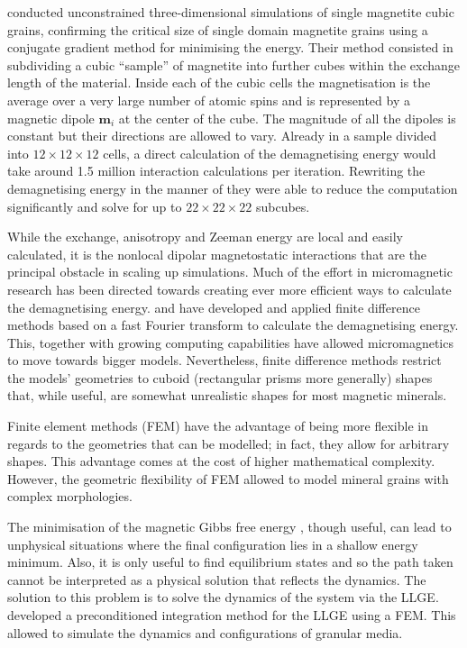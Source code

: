 \citet{Wyn2} conducted unconstrained three-dimensional simulations of single magnetite cubic grains, confirming the critical size of single domain magnetite grains using a conjugate gradient method for minimising the energy. Their method consisted in subdividing a cubic ``sample'' of magnetite into further cubes within the exchange length of the material. Inside each of the cubic cells the magnetisation is the average over a very large number of atomic spins and is represented by a magnetic dipole $\mathbf{m}_i$ at the center of the cube. The magnitude of all the dipoles is constant but their directions are allowed to vary. Already in a sample divided into $12\times 12\times 12$ cells, a direct calculation of the demagnetising energy would take around 1.5 million interaction calculations per iteration. Rewriting the demagnetising energy in the manner of \citet{Rhodes} they were able to reduce the computation significantly and solve for up to $22\times 22\times 22$ subcubes.\par

While the exchange, anisotropy and Zeeman energy are local and easily calculated, it is the nonlocal dipolar magnetostatic interactions that are the principal obstacle in scaling up simulations. Much of the effort in micromagnetic research has been directed towards creating ever more efficient ways to calculate the demagnetising energy. \citet{Fabian} and \citet{Wright} have developed and applied finite difference methods based on a fast Fourier transform to calculate the demagnetising energy. This, together with growing computing capabilities have allowed micromagnetics to move towards bigger models. Nevertheless, finite difference methods restrict the models' geometries to cuboid (rectangular prisms more generally) shapes that, while useful, are somewhat unrealistic shapes for most magnetic minerals.\par

Finite element methods (FEM) have the advantage of being more flexible in regards to the geometries that can be modelled; in fact, they allow for arbitrary shapes. This advantage comes at the cost of higher mathematical complexity. However, the geometric flexibility of FEM allowed \citet{Wyn1} to model mineral grains with complex morphologies.\par

The minimisation of the magnetic Gibbs free energy , though useful, can lead to unphysical situations where the final configuration lies in a shallow energy minimum. Also, it is only useful to find equilibrium states and so the path taken cannot be interpreted as a physical solution that reflects the dynamics. The solution to this problem is to solve the dynamics of the system via the LLGE. \citet{Suess} developed a preconditioned integration method for the LLGE using a FEM. This allowed to simulate the dynamics and configurations of granular media.\par

